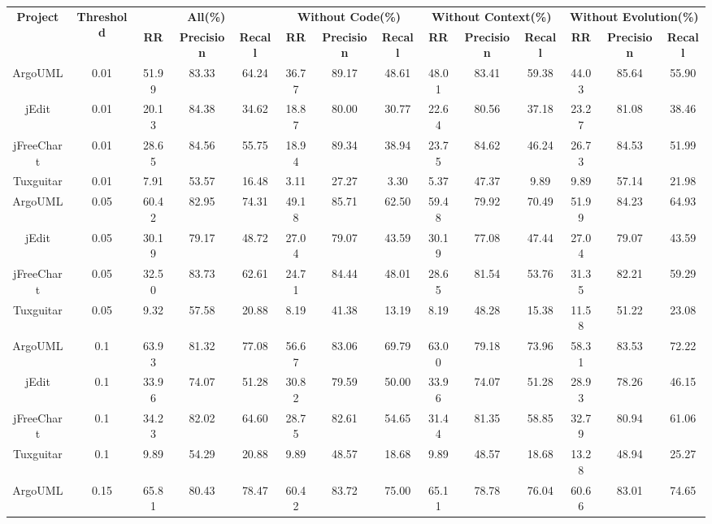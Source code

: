 {\begin{table}[htbp]
\vspace{0.5em}\centering\wuhao
\begin{tabular}{cccccccccccccc}
\toprule[1.5pt]
\multirow{2}{*}{\textbf{Project}}&\multirow{2}{*}{\textbf{Threshold}}&\multicolumn{3}{|c|}{\textbf{All(\%)}}&\multicolumn{3}{|c|}{\textbf{Without Code(\%)}}&\multicolumn{3}{|c|}{\textbf{Without Context(\%)}}&\multicolumn{3}{|c|}{\textbf{Without Evolution(\%)}}\\
\cline{3-14}
&&\textbf{RR}&\textbf{Precision}&\textbf{Recall}&\textbf{RR}&\textbf{Precision}&\textbf{Recall}&\textbf{RR}&\textbf{Precision}&\textbf{Recall}&\textbf{RR}&\textbf{Precision}&\textbf{Recall}\\
\midrule[1pt]
ArgoUML&0.01&	51.99&	83.33&	64.24&	36.77&	89.17&	48.61&	48.01&	83.41&	59.38&	44.03&	85.64&	55.90\\
jEdit&0.01&	20.13&	84.38&	34.62&	18.87&	80.00&	30.77&	22.64&	80.56&	37.18&	23.27&	81.08&	38.46\\
jFreeChart&0.01& 28.65&	84.56&	55.75&	18.94&	89.34&	38.94&	23.75&	84.62&	46.24&	26.73&	84.53&	51.99\\
Tuxguitar&0.01&	7.91&	53.57&	16.48&	3.11&	27.27&	3.30&	5.37&	47.37&	9.89&	9.89&	57.14&	21.98\\
\hline
ArgoUML&0.05&	60.42&	82.95&	74.31&	49.18&	85.71&	62.50&	59.48&	79.92&	70.49&	51.99&	84.23&	64.93\\
jEdit&0.05&	30.19&	79.17&	48.72&	27.04&	79.07&	43.59&	30.19&	77.08&	47.44&	27.04&	79.07&	43.59\\
jFreeChart&0.05&	32.50&	83.73&	62.61&	24.71&	84.44&	48.01&	28.65&	81.54&	53.76&	31.35&	82.21&	59.29\\
Tuxguitar&0.05&	9.32&	57.58&	20.88&	8.19&	41.38&	13.19&	8.19&	48.28&	15.38&	11.58&	51.22&	23.08\\
\hline
ArgoUML&0.1&	63.93&	81.32&	77.08&	56.67&	83.06&	69.79&	63.00&	79.18&	73.96&	58.31&	83.53&	72.22\\
jEdit&0.1&	33.96&	74.07&	51.28&	30.82&	79.59&	50.00&	33.96&	74.07&	51.28&	28.93&	78.26&	46.15\\
jFreeChart&0.1&	34.23&	82.02&	64.60&	28.75&	82.61&	54.65&	31.44&	81.35&	58.85&	32.79&	80.94&	61.06\\
Tuxguitar&0.1&	9.89&	54.29&	20.88&	9.89&	48.57&	18.68&	9.89&	48.57&	18.68&	13.28&	48.94&	25.27\\
\hline
ArgoUML&0.15&	65.81&	80.43&	78.47&	60.42&	83.72&	75.00&	65.11&	78.78&	76.04&	60.66&	83.01&	74.65\\

\end{tabular}
\end{table}}

